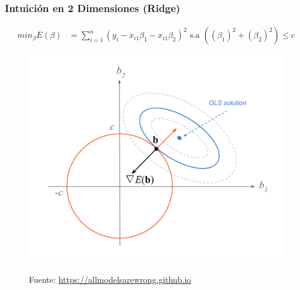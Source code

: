 \documentclass[
  shownotes,
  xcolor={svgnames},
  hyperref={colorlinks,citecolor=DarkBlue,linkcolor=DarkRed,urlcolor=DarkBlue}
  , aspectratio=169]{beamer}
\begin{document}
\begin{frame}[fragile]
\frametitle{Intuición en 2 Dimensiones (Ridge)}

\begin{align}
     min_{\beta} E(\beta) &= \sum_{i=1}^n (y_i - x_{i1}\beta_1 - x_{i1}\beta_2)^2  \text{ s.a }   \left( (\beta_1)^2 + (\beta_2)^2 \right) \leq c 
  \end{align}

\begin{figure}[H] \centering
            \captionsetup{justification=centering}
              \includegraphics[scale=0.3]{figures/ridge4}
 
\tiny
Fuente: \url{https://allmodelsarewrong.github.io}
\end{figure}


\end{frame}
\end{document}

